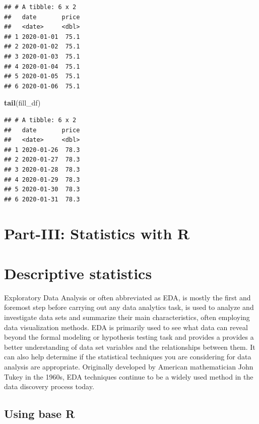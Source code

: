 \documentclass[
]{book}
\newenvironment{Shaded}{\begin{snugshade}}{\end{snugshade}}
\newcommand{\FunctionTok}[1]{\textcolor[rgb]{0.13,0.29,0.53}{\textbf{#1}}}
\newcommand{\NormalTok}[1]{#1}
\begin{document}
\begin{verbatim}
## # A tibble: 6 x 2
##   date       price
##   <date>     <dbl>
## 1 2020-01-01  75.1
## 2 2020-01-02  75.1
## 3 2020-01-03  75.1
## 4 2020-01-04  75.1
## 5 2020-01-05  75.1
## 6 2020-01-06  75.1
\end{verbatim}

\begin{Shaded}
\begin{Highlighting}[]
\FunctionTok{tail}\NormalTok{(fill\_df)}
\end{Highlighting}
\end{Shaded}

\begin{verbatim}
## # A tibble: 6 x 2
##   date       price
##   <date>     <dbl>
## 1 2020-01-26  78.3
## 2 2020-01-27  78.3
## 3 2020-01-28  78.3
## 4 2020-01-29  78.3
## 5 2020-01-30  78.3
## 6 2020-01-31  78.3
\end{verbatim}

\hypertarget{part-iii-statistics-with-r}{%
\chapter*{Part-III: Statistics with R}\label{part-iii-statistics-with-r}}

\hypertarget{descriptive-statistics}{%
\chapter{Descriptive statistics}\label{descriptive-statistics}}

Exploratory Data Analysis or often abbreviated as EDA, is mostly the first and foremost step before carrying out any data analytics task, is used to analyze and investigate data sets and summarize their main characteristics, often employing data visualization methods. EDA is primarily used to see what data can reveal beyond the formal modeling or hypothesis testing task and provides a provides a better understanding of data set variables and the relationships between them. It can also help determine if the statistical techniques you are considering for data analysis are appropriate. Originally developed by American mathematician John Tukey in the 1960s, EDA techniques continue to be a widely used method in the data discovery process today.

\hypertarget{using-base-r}{%
\section{Using base R}\label{using-base-r}}
\end{document}
